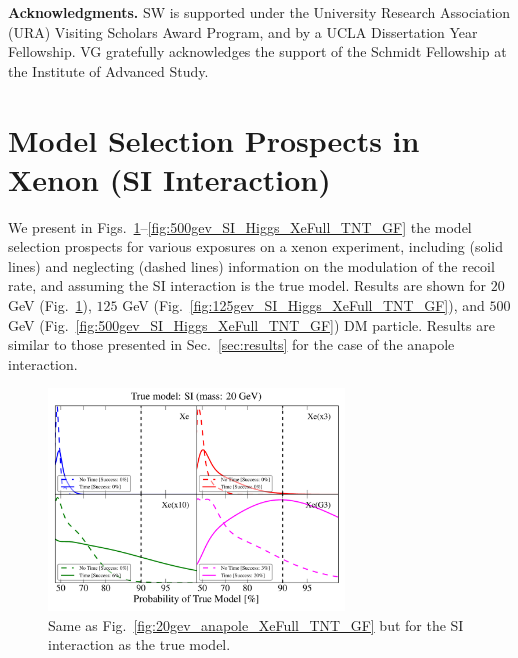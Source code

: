 \documentclass[11pt]{article}
\newcommand{\Sec}[1]{Sec.~\ref{#1}} \newcommand{\Secs}[2]{Secs.~\ref{#1} and \ref{#2}} \newcommand{\Secm}[2]{Secs.~\ref{#1} through \ref{#2}}
\newcommand{\Fig}[1]{Fig.~\ref{#1}} \newcommand{\Figs}[2]{Figs.~\ref{#1} and \ref{#2}}
\begin{document}
\bigskip

\textbf{Acknowledgments.} SW is supported under the University Research Association (URA) Visiting Scholars Award Program, and by a UCLA Dissertation Year Fellowship. VG gratefully acknowledges the support of the Schmidt Fellowship at the Institute of Advanced Study. %

\appendix

\section{Model Selection Prospects in Xenon (SI Interaction)}
We present in Figs.~\ref{fig:20gev_SI_Higgs_XeFull_TNT_GF}--\ref{fig:500gev_SI_Higgs_XeFull_TNT_GF} the model selection prospects for various exposures on a xenon experiment, including (solid lines) and neglecting (dashed lines) information on the modulation of the recoil rate, and assuming the SI interaction is the true model. Results are shown for $20$ GeV (\Fig{fig:20gev_SI_Higgs_XeFull_TNT_GF}), $125$ GeV (\Fig{fig:125gev_SI_Higgs_XeFull_TNT_GF}), and $500$ GeV (\Fig{fig:500gev_SI_Higgs_XeFull_TNT_GF}) DM particle. Results are similar to those presented in \Sec{sec:results} for the case of the anapole interaction. 


\begin{figure}
\centering
\includegraphics[width=0.7\textwidth]{plots/PDF_20GeV_SI_Higgs_50sims_Xe_Xe3x_Xe10x_XeG3_GF_TNT.pdf}
\caption{\label{fig:20gev_SI_Higgs_XeFull_TNT_GF}
Same as Fig.~\ref{fig:20gev_anapole_XeFull_TNT_GF} but for the SI interaction as the true model.}
\end{figure}
\end{document}
